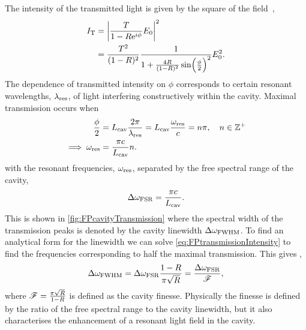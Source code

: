 \documentclass[../Thesis-IJspeert.tex]{subfiles}
\begin{document}
The intensity of the transmitted light is given by the square of the field~\cite{ismail16},
\begin{equation}
\begin{aligned}
I_{\mathrm{T}} &= \abs{\frac{T}{1-R \mathrm{e}^{i \phi}}E_{\mathrm{0}}}^2 \\
&= \frac{T^2}{(1-R)^2} \frac{1}{1+\frac{4R}{(1-R)^2}\sin(\frac{\phi}{2})^2}E_0^2.
\label{eq:FPtransmissionIntensity}
\end{aligned}
\end{equation} 
The dependence of transmitted intensity on $\phi$ corresponds to certain resonant wavelengths, $\lambda_{\mathrm{res}}$, of light interfering constructively within the cavity. Maximal transmission occurs when
\begin{equation}
\begin{aligned}
	\frac{\phi}{2} &= L_{\mathrm{cav}} \frac{2\pi}{\lambda_{\mathrm{res}}} = L_{\mathrm{cav}} \frac{\omega_{\mathrm{res}}}{c} = n\pi, \quad n \in \mathbb{Z}^+ \\
	\implies \omega_{\mathrm{res}} &= \frac{\pi c}{L_{\mathrm{cav}}}n.
\label{eq:FPtransmissionPeaks}
\end{aligned}
\end{equation} 
with the resonant frequencies, $\omega_{\mathrm{res}}$, separated by the free spectral range of the cavity,
\begin{equation}
	\Delta\omega_{\mathrm{FSR}} = \frac{\pi c}{L_{\mathrm{cav}}}.  
\label{eq:FPtransmissionFSR}
\end{equation} 
This is shown in \cref{fig:FPcavityTransmission} where the spectral width of the transmission peaks is denoted by the cavity linewidth $\Delta\omega_{\mathrm{FWHM}}$.  To find an analytical form for the linewidth we can solve \cref{eq:FPtransmissionIntensity} to find the frequencies corresponding to half the maximal transmission.  This gives \cite{ismail16,fox06},
\begin{equation}
	\Delta\omega_{\mathrm{FWHM}} = \Delta\omega_{\mathrm{FSR}} \frac{1-R}{\pi\sqrt{R}} = \frac{\Delta\omega_{\mathrm{FSR}}}{\mathscr{F}},
	\label{eq:FPtransmissionFWHM}
\end{equation}
where $\mathscr{F} = \frac{\pi \sqrt{R}}{1-R}$ is defined as the cavity finesse.  Physically the finesse is defined by the ratio of the free spectral range to the cavity linewidth, but it also characterises the enhancement of a resonant light field in the cavity.
\end{document}
